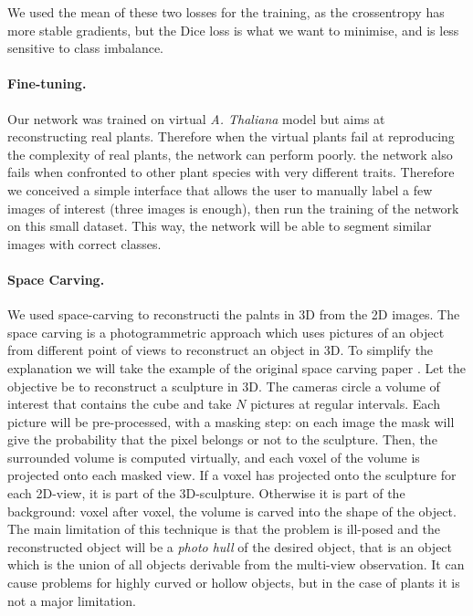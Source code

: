 We used the mean of these two losses for the training, as the
crossentropy has more stable gradients, but the Dice loss is what we
want to minimise, and is less sensitive to class imbalance.


\paragraph{Fine-tuning.} Our network was trained on virtual \textit{A.
Thaliana} model but aims at reconstructing real plants. Therefore when
the virtual plants fail at reproducing the complexity of real plants,
the network can perform poorly. the network also fails when confronted
to other plant species with very different traits. Therefore we
conceived a simple interface that allows the user to manually label a
few images of interest (three images is enough), then run the training
of the network on this small dataset. This way, the network will be
able to segment similar images with correct classes.


\paragraph{Space Carving.} We used space-carving to reconstructi
the palnts in 3D from the 2D images. The space carving
\cite{kutulakos_theory_1999} is a photogrammetric approach which uses
pictures of an object from different point of views to reconstruct
an object in 3D. To simplify the explanation we will take the example
of the original space carving paper \cite{kutulakos_theory_1999}. Let
the objective be to reconstruct a sculpture in 3D. The cameras circle
a volume of interest that contains the cube and take $N$ pictures
at regular intervals. Each picture will be pre-processed, with a
masking step: on each image the mask will give the probability that
the pixel belongs or not to the sculpture. Then, the surrounded volume
is computed virtually, and each voxel of the volume is projected onto
each masked view. If a voxel has projected onto the sculpture for each
2D-view, it is part of the 3D-sculpture. Otherwise it is part of the
background: voxel after voxel, the volume is carved into the shape of
the object. The main limitation of this technique is that the problem
is ill-posed and the reconstructed object will be a \textit{photo
hull} \cite{kutulakos_theory_1999} of the desired object, that is an
object which is the union of all objects derivable from the multi-view
observation. It can cause problems for highly curved or hollow objects,
but in the case of plants it is not a major limitation.

